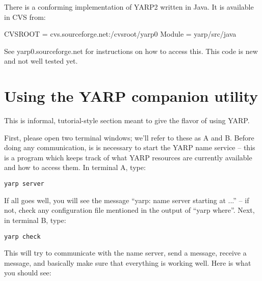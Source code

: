 \documentclass[a4]{article}
\begin{document}
There is a conforming implementation of YARP2 written in Java.
It is available in CVS from:
\begin{code}
  CVSROOT = cvs.sourceforge.net:/cvsroot/yarp0
  Module = yarp/src/java
\end{code}
See yarp0.sourceforge.net for instructions on how to access this.
This code is new and not well tested yet.


\appendix

\section{Using the YARP companion utility}

\label{sect:using-utility}

This is informal, tutorial-style section meant to give the flavor
of using YARP.

First, please
open two terminal windows; we'll refer to these as A and B.
%
Before doing any communication, is is necessary to start the YARP name
service -- this is a program which keeps track of what YARP resources
are currently available and how to access them.
%
In terminal A, type:

\begin{verbatim}
yarp server
\end{verbatim}

If all goes well, you will see the message ``yarp: name server starting at ...'' -- if not, check any configuration file
mentioned in the output of ``yarp where''.
%
Next, in terminal B, type:
%
\begin{verbatim}
yarp check
\end{verbatim}
%
This will try to communicate with the name server, send a message,
receive a message, and basically make sure that everything is
working well.  Here is what you should see:
\end{document}
